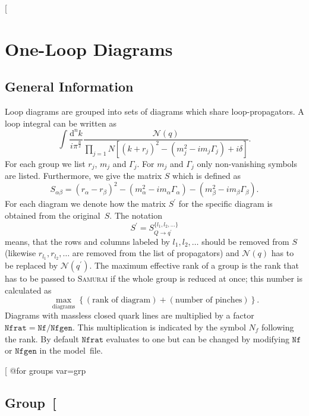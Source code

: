 {{{{[%
\section{One-Loop Diagrams}
\subsection*{General Information}


Loop diagrams are grouped into sets of diagrams which share
loop-propagators. A loop integral can be written as
\begin{equation}
\int\!\frac{\mathrm{d}^nk}{i\pi^{\frac{n}{2}}}%
\frac{\mathcal{N}(q)}{\prod_{j=1}{N}\left[(k+r_j)^2-(m_j^2
   -i m_j\Gamma_j) + i\delta\right]}.
\end{equation}
For each group we list $r_j$, $m_j$ and $\Gamma_j$.
For $m_j$ and $\Gamma_j$ only non-vanishing symbols are listed.
Furthermore, we give the matrix $S$ which is defined as
\begin{equation}
S_{\alpha\beta} = (r_\alpha-r_\beta)^2
-(m_\alpha^2-im_\alpha\Gamma_\alpha)
-(m_\beta^2-im_\beta\Gamma_\beta).
\end{equation}
For each diagram we denote how the matrix $S^\prime$ for the specific diagram
is obtained from the original~$S$. The notation
\begin{equation}
S^\prime=S_{Q\to q^\prime}^{\{l_1,l_2,\ldots\}}
\end{equation}
means, that the rows and columns labeled by $l_1,l_2,\ldots$ should be
removed from $S$ (likewise $r_{l_1}, r_{l_2}, \ldots$ are removed from the
list of propagators) and $\mathcal{N}(q)$ has to be replaced by
$\mathcal{N}(q^\prime)$.
The maximum effective rank of a group is the rank that has to be passed
to \textsc{Samurai} if the whole group is reduced at once; this number
is calculated as
\begin{equation}
\max_{\text{diagrams}}\left\{(\text{rank of diagram})+
(\text{number of pinches})\right\}.
\end{equation}
Diagrams with massless closed quark lines are multiplied by a factor
$\mathtt{Nfrat}=\mathtt{Nf}/\mathtt{Nfgen}$. This multiplication is indicated
by the symbol $N_f$ following the rank. By default $\mathtt{Nfrat}$ evaluates
to one but can be changed by modifying $\mathtt{Nf}$ or $\mathtt{Nfgen}$ in the
model~file.

[%
@for groups var=grp %
\subsection{Group~[%
}}}}}
